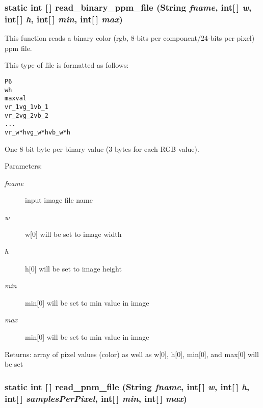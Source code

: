 \subsubsection{\setlength{\rightskip}{0pt plus 5cm}static int [$\,$] read\_\-binary\_\-ppm\_\-file (String {\em fname}, int[$\,$] {\em w}, int[$\,$] {\em h}, int[$\,$] {\em min}, int[$\,$] {\em max})\hspace{0.3cm}{\tt  [static, protected]}}\label{class_c_s_image_viewer_1_1pnm_helper_aac77a4848c332712dd805d33b9d815b}


This function reads a binary color (rgb, 8-bits per component/24-bits per pixel) ppm file. 

This type of file is formatted as follows: \small\begin{alltt}
    P6
    w h
    maxval
    vr\_1 vg\_1 vb\_1 
    vr\_2 vg\_2 vb\_2
    . . .
    vr\_w*h vg\_w*h vb\_w*h
  \end{alltt}\normalsize 
 One 8-bit byte per binary value (3 bytes for each RGB value).

\begin{Desc}
\item[Parameters:]
\begin{description}
\item[{\em fname}]input image file name \item[{\em w}]w[0] will be set to image width \item[{\em h}]h[0] will be set to image height \item[{\em min}]min[0] will be set to min value in image \item[{\em max}]min[0] will be set to min value in image\end{description}
\end{Desc}
\begin{Desc}
\item[Returns:]array of pixel values (color) as well as w[0], h[0], min[0], and max[0] will be set \end{Desc}
\subsubsection{\setlength{\rightskip}{0pt plus 5cm}static int [$\,$] read\_\-pnm\_\-file (String {\em fname}, int[$\,$] {\em w}, int[$\,$] {\em h}, int[$\,$] {\em samples\-Per\-Pixel}, int[$\,$] {\em min}, int[$\,$] {\em max})\hspace{0.3cm}{\tt  [static]}}\label{class_c_s_image_viewer_1_1pnm_helper_06e33b709cf385d3b8e5d33a1064acb0}


